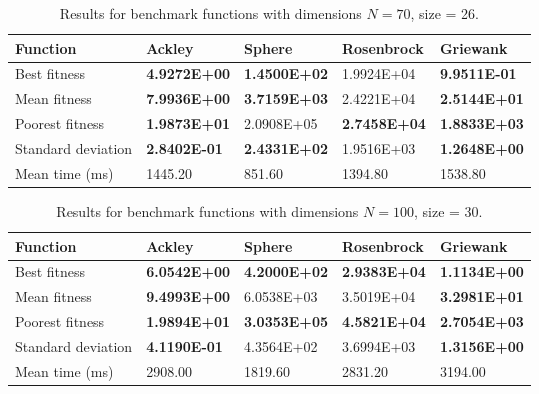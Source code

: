\documentclass[KomodoMain.tex]{subfiles}
\begin{document}
\begin{table}[!htbp]
\small
\caption{ \small Results for benchmark functions with dimensions $N = 70$, size = 26.}
\label{table:X}
\begin{tabular}{ p{3cm} p{2.4cm} p{2.4cm} p{2.4cm} p{2.4cm}}
 \hline
 Function   & Ackley  & Sphere & Rosenbrock & Griewank \\
 \hline
 Best fitness   & \textbf{4.9272E+00}  & \textbf{1.4500E+02} &  1.9924E+04 & \textbf{9.9511E-01} \\
 
 Mean fitness & \textbf{7.9936E+00} & \textbf{3.7159E+03} & 2.4221E+04 & \textbf{2.5144E+01} \\
 
 Poorest fitness & \textbf{1.9873E+01} & 2.0908E+05 & \textbf{2.7458E+04} & \textbf{1.8833E+03} \\
 
 Standard deviation & \textbf{2.8402E-01} & \textbf{2.4331E+02} & 1.9516E+03 & \textbf{1.2648E+00} \\
 
 Mean time (ms) & 1445.20 & 851.60 & 1394.80 & 1538.80 \\
 \hline
\end{tabular}
\end{table}


\begin{table}[!htbp]
\small
\caption{ \small Results for benchmark functions with dimensions $N = 100$, size = 30.}
\label{table:X}
\begin{tabular}{ p{3cm} p{2.4cm} p{2.4cm} p{2.4cm} p{2.4cm}}
 \hline
 Function   & Ackley  & Sphere & Rosenbrock & Griewank \\
 \hline
 Best fitness   & \textbf{6.0542E+00}  & \textbf{4.2000E+02} &  \textbf{2.9383E+04} & \textbf{1.1134E+00} \\
 
 Mean fitness & \textbf{9.4993E+00} & 6.0538E+03 & 3.5019E+04 & \textbf{3.2981E+01} \\
 
 Poorest fitness & \textbf{1.9894E+01} & \textbf{3.0353E+05} & \textbf{4.5821E+04} & \textbf{2.7054E+03} \\
 
 Standard deviation & \textbf{4.1190E-01} & 4.3564E+02 & 3.6994E+03 & \textbf{1.3156E+00} \\
 
 Mean time (ms) & 2908.00 & 1819.60 & 2831.20 & 3194.00 \\
 \hline
\end{tabular}
\end{table}
\end{document}

